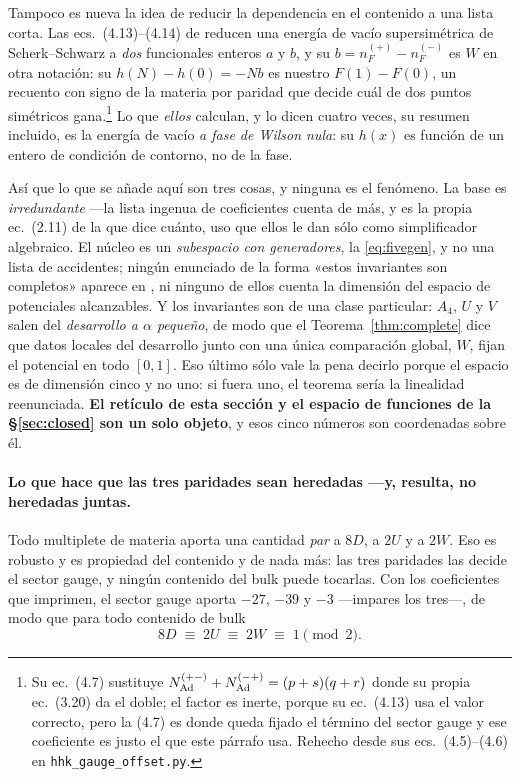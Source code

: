 \documentclass[11pt,a4paper]{article}
\begin{document}
\noindent Tampoco es nueva la idea de reducir la dependencia en el contenido a una lista corta. Las
ecs.~(4.13)--(4.14) de \cite{HHK03} reducen una energía de vacío supersimétrica de Scherk--Schwarz
a \emph{dos} funcionales enteros $a$ y $b$, y su $b=n_F^{(+)}-n_F^{(-)}$ es $W$ en otra notación:
su $h(N)-h(0)=-Nb$ es nuestro $F(1)-F(0)$, un recuento con signo de la materia por paridad que
decide cuál de dos puntos simétricos gana.\footnote{Su ec.~(4.7) sustituye
$N_{\rm Ad}^{(+-)}+N_{\rm Ad}^{(-+)}=(p+s)(q+r)$ donde su propia ec.~(3.20) da el doble; el factor
es inerte, porque su ec.~(4.13) usa el valor correcto, pero la (4.7) es donde queda fijado el
término del sector gauge y ese coeficiente es justo el que este párrafo usa. Rehecho desde sus
ecs.~(4.5)--(4.6) en \texttt{hhk\_\allowbreak gauge\_\allowbreak offset.py}.} Lo que \emph{ellos}
calculan, y lo dicen cuatro veces, su resumen incluido, es la energía de vacío \emph{a fase de
Wilson nula}: su $h(x)$ es función de un entero de condición de contorno, no de la fase.

\noindent Así que lo que se añade aquí son tres cosas, y ninguna es el fenómeno. La base es
\emph{irredundante} ---la lista ingenua de coeficientes cuenta de más, y es la propia ec.~(2.11) de
\cite{CCD24} la que dice cuánto, uso que ellos le dan sólo como simplificador algebraico. El núcleo
es un \emph{subespacio con generadores}, la \eqref{eq:fivegen}, y no una lista de accidentes;
ningún enunciado de la forma «estos invariantes son completos» aparece en \cite{HY04,HHK03,CCD24},
ni ninguno de ellos cuenta la dimensión del espacio de potenciales alcanzables. Y los invariantes
son de una clase particular: $A_4$, $U$ y $V$ salen del \emph{desarrollo a $\alpha$ pequeño}, de
modo que el Teorema~\ref{thm:complete} dice que datos locales del desarrollo junto con una única
comparación global, $W$, fijan el potencial en todo $[0,1]$. Eso último sólo vale la pena decirlo
porque el espacio es de dimensión cinco y no uno: si fuera uno, el teorema sería la linealidad
reenunciada. \textbf{El retículo de esta sección y el espacio de funciones de la \S\ref{sec:closed}
son un solo objeto}, y esos cinco números son coordenadas sobre él.

\paragraph{Lo que hace que las tres paridades sean heredadas ---y, resulta, no heredadas juntas.}
Todo multiplete de materia aporta una cantidad \emph{par} a $8D$, a $2U$ y a $2W$. Eso es robusto y
es propiedad del contenido y de nada más: las tres paridades las decide el sector gauge, y ningún
contenido del bulk puede tocarlas. Con los coeficientes que \cite{KM25} imprimen, el sector gauge
aporta $-27$, $-39$ y $-3$ ---impares los tres---, de modo que para todo contenido de bulk
\begin{equation}\label{eq:parity3}
  8D\;\equiv\;2U\;\equiv\;2W\;\equiv\;1\pmod 2 .
\end{equation}
\end{document}
